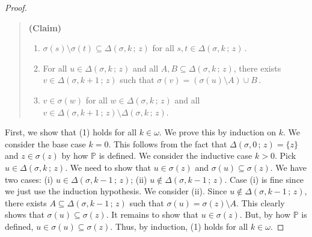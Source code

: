 \documentclass[10pt,a4paper, openany,  oldfontcommands]{memoir}
\newtheorem{open problem} [theorem] {Open Problem}
\begin{document}
\begin{proof}
\begin{quote} {\bf (Claim)}
\begin{enumerate}
  
    
  \item   $  \sigma (s)  \setminus  \sigma (t)   \subseteq       \Delta \left(  \sigma , k   \,  ;   \,   z  \right)    $
  for all $  s, t  \in     \Delta \left(  \sigma , k   \,  ;   \,   z  \right)         \,   $. 
  
  
  
  
  
  \item  For all $  u \in   \Delta \left(  \sigma , k   \,  ;   \,   z  \right)    $  and all $  A, B  \subseteq    \Delta \left(  \sigma , k   \,  ;   \,   z  \right)   $,   there exists  $  v  \in    \Delta \left(  \sigma , k+1   \,  ;   \,   z  \right)   $
  such that    $  \sigma (v)  =   \left(   \sigma (u)  \setminus   A   \right)  \cup   B      \,     $. 

  
  

  \item    $  v   \in  \sigma (w)     $  for    all   $  w  \in    \Delta \left(  \sigma , k   \,  ;   \,   z  \right)    $  and  
all $  v  \in   \Delta \left(  \sigma , k +1  \,  ;   \,   z  \right)     \setminus    \Delta \left(  \sigma , k   \,  ;   \,   z  \right)    $.  
  \end{enumerate}
 \end{quote}  




First,  we show that (1) holds for all $ k   \in  \omega   $. 
We prove this by induction on $k$. 
We consider the base case $  k =  0 $. 
This follows from the fact that  $    \Delta \left(  \sigma , 0  \,  ;   \,   z  \right)    =  \lbrace z  \rbrace  $  
and   $  z  \in    \sigma (z)        $  by how    $  \mathbb{P} $  is defined. 
We consider the inductive case   $  k >  0 $. 
Pick  $  u  \in    \Delta \left(  \sigma , k  \,  ;   \,   z  \right)   $. 
We need to show that  $  u  \in  \sigma (z)  $  and  $  \sigma (u)   \subseteq   \sigma (z)  $. 
We have two cases: 
(i)   $  u  \in     \Delta \left(  \sigma , k-1  \,  ;   \,   z  \right)    $; 
(ii) $  u  \not\in   \Delta \left(  \sigma , k-1  \,  ;   \,   z  \right)    $. 
Case  (i) is fine since we just use the induction hypothesis. 
We consider (ii). 
Since $  u  \not\in   \Delta \left(  \sigma , k-1  \,  ;   \,   z  \right)    $,   there exists   $  A  \subseteq    \Delta \left(  \sigma , k-1  \,  ;   \,   z  \right)    $  such that  
$  \sigma (u)  =  \sigma (z)  \setminus  A  $. 
This clearly shows that  $  \sigma (u)   \subseteq    \sigma (z)   $. 
It remains to show that  $  u  \in  \sigma (z)  $. 
But, by how  $  \mathbb{P} $  is defined,  $  u  \in   \sigma (u)   \subseteq   \sigma (z)  $. 
Thus, by induction,  (1)  holds for all $ k  \in  \omega  $. 







\end{proof}
\end{document}
